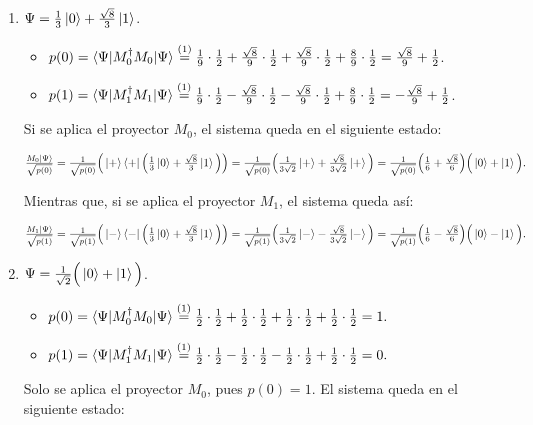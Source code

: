 \documentclass[a4paper,11pt]{article}
\begin{document}
\begin{enumerate}[label=\alph*)]
\item $\Psi = \frac{1}{3}\left\vert{0}\right\rangle + \frac{\sqrt{8}}{3}\left\vert{1}\right\rangle$. 

  \begin{itemize}
  \item $p(0) = \braket{\Psi | M_0^{\dag} M_0 | \Psi} \stackrel{(1)}{=} \frac{1}{9}\cdot\frac{1}{2} + 
    \frac{\sqrt{8}}{9}\cdot\frac{1}{2} + \frac{\sqrt{8}}{9}\cdot\frac{1}{2}
    + \frac{8}{9}\cdot\frac{1}{2} = \frac{\sqrt{8}}{9} + \frac{1}{2}$.
  \item $p(1) = \braket{\Psi | M_1^{\dag} M_1 | \Psi} \stackrel{(1)}{=} 
    \frac{1}{9}\cdot\frac{1}{2} - \frac{\sqrt{8}}{9}\cdot\frac{1}{2} - \frac{\sqrt{8}}{9}\cdot\frac{1}{2}
    + \frac{8}{9}\cdot\frac{1}{2} = - \frac{\sqrt{8}}{9} + \frac{1}{2}$.
  \end{itemize}

Si se aplica el proyector $M_0$, el sistema queda en el siguiente estado:

$\frac{M_0 \left\vert{\Psi}\right\rangle}{\sqrt{p(0)}} = \frac{1}{\sqrt{p(0)}} \Big( \left\vert{+}\right\rangle\left\langle{+}\right\vert\Big( \frac{1}{3}\left\vert{0}\right\rangle + 
\frac{\sqrt{8}}{3}\left\vert{1}\right\rangle \Big) \Big) =
\frac{1}{\sqrt{p(0)}} \Big( \frac{1}{3\sqrt{2}}\left\vert{+}\right\rangle + \frac{\sqrt{8}}{3\sqrt{2}}\left\vert{+}\right\rangle \Big) =
\frac{1}{\sqrt{p(0)}} \Big( \frac{1}{6} + \frac{\sqrt{8}}{6} \Big) \Big( \left\vert{0}\right\rangle + \left\vert{1}\right\rangle \Big).$

Mientras que, si se aplica el proyector $M_1$, el sistema queda así:

$\frac{M_1 \left\vert{\Psi}\right\rangle}{\sqrt{p(1)}} = \frac{1}{\sqrt{p(1)}} \Big( \left\vert{-}\right\rangle\left\langle{-}\right\vert\Big( \frac{1}{3}\left\vert{0}\right\rangle + 
\frac{\sqrt{8}}{3}\left\vert{1}\right\rangle \Big) \Big) =
\frac{1}{\sqrt{p(1)}} \Big( \frac{1}{3\sqrt{2}}\left\vert{-}\right\rangle - \frac{\sqrt{8}}{3\sqrt{2}}\left\vert{-}\right\rangle \Big) =
\frac{1}{\sqrt{p(1)}} \Big( \frac{1}{6} - \frac{\sqrt{8}}{6} \Big) \Big( \left\vert{0}\right\rangle - \left\vert{1}\right\rangle \Big).$

\item $\Psi = \frac{1}{\sqrt{2}} \Big( \left\vert{0}\right\rangle + \left\vert{1}\right\rangle \Big)$. 

  \begin{itemize}
  \item $p(0) = \braket{\Psi | M_0^{\dag} M_0 | \Psi} \stackrel{(1)}{=}
    \frac{1}{2}\cdot\frac{1}{2} + \frac{1}{2}\cdot\frac{1}{2} + \frac{1}{2}\cdot\frac{1}{2} +
    \frac{1}{2}\cdot\frac{1}{2} = 1.$
  \item $p(1) = \braket{\Psi | M_1^{\dag} M_1 | \Psi} \stackrel{(1)}{=}
    \frac{1}{2}\cdot\frac{1}{2} - \frac{1}{2}\cdot\frac{1}{2} - \frac{1}{2}\cdot\frac{1}{2} +
    \frac{1}{2}\cdot\frac{1}{2} = 0.$
  \end{itemize}
  Solo se aplica el proyector $M_0$, pues $p(0) = 1$. El sistema queda en el siguiente estado:


\end{enumerate}
\end{document}
